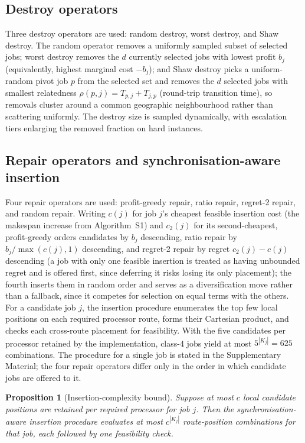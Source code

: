 \documentclass[preprint,12pt]{elsarticle}
\newtheorem{proposition}{Proposition}
\begin{document}
\subsection{Destroy operators}

Three destroy operators are used: random destroy, worst destroy, and Shaw destroy. The random operator removes a uniformly sampled subset of selected jobs; worst destroy removes the $d$ currently selected jobs with lowest profit $b_j$ (equivalently, highest marginal cost $-b_j$); and Shaw destroy picks a uniform-random pivot job $p$ from the selected set and removes the $d$ selected jobs with smallest relatedness $\rho(p,j) = T_{p,j}+T_{j,p}$ (round-trip transition time), so removals cluster around a common geographic neighbourhood rather than scattering uniformly. The destroy size is sampled dynamically, with escalation tiers enlarging the removed fraction on hard instances.

\subsection{Repair operators and synchronisation-aware insertion}

Four repair operators are used: profit-greedy repair, ratio repair, regret-2 repair, and random repair. Writing $c(j)$ for job $j$'s cheapest feasible insertion cost (the makespan increase from Algorithm~S1) and $c_2(j)$ for its second-cheapest, profit-greedy orders candidates by $b_j$ descending, ratio repair by $b_j/\max(c(j),1)$ descending, and regret-2 repair by regret $c_2(j)-c(j)$ descending (a job with only one feasible insertion is treated as having unbounded regret and is offered first, since deferring it risks losing its only placement); the fourth inserts them in random order and serves as a diversification move rather than a fallback, since it competes for selection on equal terms with the others. For a candidate job $j$, the insertion procedure enumerates the top few local positions on each required processor route, forms their Cartesian product, and checks each cross-route placement for feasibility. With the five candidates per processor retained by the implementation, class-4 jobs yield at most $5^{|K_j|}=625$ combinations. The procedure for a single job is stated in the Supplementary Material; the four repair operators differ only in the order in which candidate jobs are offered to it.

\begin{proposition}[Insertion-complexity bound]
Suppose at most $c$ local candidate positions are retained per required processor for job $j$. Then the synchronisation-aware insertion procedure evaluates at most $c^{|K_j|}$ route-position combinations for that job, each followed by one feasibility check.
\end{proposition}
\end{document}
